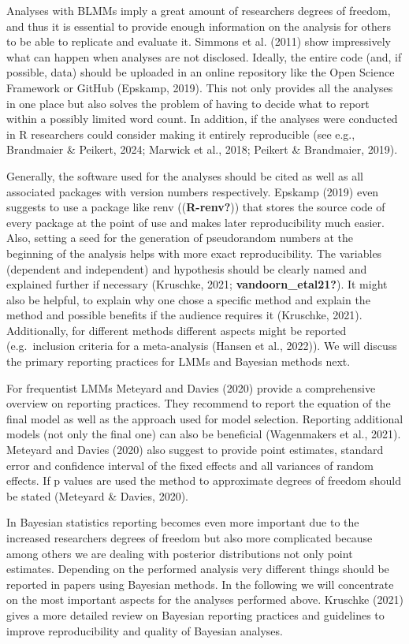 \documentclass[
  doc,12pt,floatsintext]{apa7}
\begin{document}
Analyses with BLMMs imply a great amount of researchers degrees of freedom, and thus it is essential to provide enough information on the analysis for others to be able to replicate and evaluate it. Simmons et al. (2011) show impressively what can happen when analyses are not disclosed. Ideally, the entire code (and, if possible, data) should be uploaded in an online repository like the Open Science Framework or GitHub (Epskamp, 2019). This not only provides all the analyses in one place but also solves the problem of having to decide what to report within a possibly limited word count. In addition, if the analyses were conducted in R researchers could consider making it entirely reproducible (see e.g., Brandmaier \& Peikert, 2024; Marwick et al., 2018; Peikert \& Brandmaier, 2019).

Generally, the software used for the analyses should be cited as well as all associated packages with version numbers respectively. Epskamp (2019) even suggests to use a package like renv ((\textbf{R-renv?})) that stores the source code of every package at the point of use and makes later reproducibility much easier. Also, setting a seed for the generation of pseudorandom numbers at the beginning of the analysis helps with more exact reproducibility. The variables (dependent and independent) and hypothesis should be clearly named and explained further if necessary (Kruschke, 2021; \textbf{vandoorn\_etal21?}). It might also be helpful, to explain why one chose a specific method and explain the method and possible benefits if the audience requires it (Kruschke, 2021). Additionally, for different methods different aspects might be reported (e.g.~inclusion criteria for a meta-analysis (Hansen et al., 2022)). We will discuss the primary reporting practices for LMMs and Bayesian methods next.

For frequentist LMMs Meteyard and Davies (2020) provide a comprehensive overview on reporting practices. They recommend to report the equation of the final model as well as the approach used for model selection. Reporting additional models (not only the final one) can also be beneficial (Wagenmakers et al., 2021). Meteyard and Davies (2020) also suggest to provide point estimates, standard error and confidence interval of the fixed effects and all variances of random effects. If p values are used the method to approximate degrees of freedom should be stated (Meteyard \& Davies, 2020).

In Bayesian statistics reporting becomes even more important due to the increased researchers degrees of freedom but also more complicated because among others we are dealing with posterior distributions not only point estimates. Depending on the performed analysis very different things should be reported in papers using Bayesian methods. In the following we will concentrate on the most important aspects for the analyses performed above. Kruschke (2021) gives a more detailed review on Bayesian reporting practices and guidelines to improve reproducibility and quality of Bayesian analyses.
\end{document}
